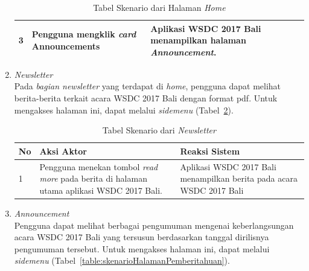 \begin{enumerate}
\begin{table}[H]
\begin{tabular}{|p{0.5cm}|p{7cm}|p{7cm}|}
				3  & Pengguna mengklik {\it card} Announcements & Aplikasi WSDC 2017 Bali menampilkan halaman \textit{Announcement}. \\ \hline
			\end{tabular}
			\caption{Tabel Skenario dari Halaman \textit{Home}}
			\label{table:skenarioHalamanUtama}
		\end{table}
	\item \textit{Newsletter} \\ 
	Pada \textit{bagian newsletter} yang terdapat di \textit{home}, pengguna dapat melihat berita-berita terkait acara WSDC 2017 Bali dengan format pdf. Untuk mengakses halaman ini, dapat melalui \textit{sidemenu} (Tabel~\ref{table:skenarioBerita}).
		\begin{table}[H]
			\centering
			\begin{tabular}{|p{0.5cm}|p{7cm}|p{7cm}|}
				\hline
				No & Aksi Aktor                               & Reaksi Sistem                                          \\ \hline
				1  & Pengguna menekan tombol {\it read more} pada berita di halaman utama aplikasi WSDC 2017 Bali. & Aplikasi WSDC 2017 Bali menampilkan berita pada acara WSDC 2017 Bali \\ \hline
			\end{tabular}
			\caption{Tabel Skenario dari \textit{Newsletter}}
			\label{table:skenarioBerita}
		\end{table}
	\item \textit{Announcement} \\ 
	Pengguna dapat melihat berbagai pengumuman mengenai keberlangsungan acara WSDC 2017 Bali yang tersusun berdasarkan tanggal dirilisnya pengumuman tersebut. Untuk mengakses halaman ini, dapat melalui \textit{sidemenu} (Tabel~\ref{table:skenarioHalamanPemberitahuan}).

\end{enumerate}
